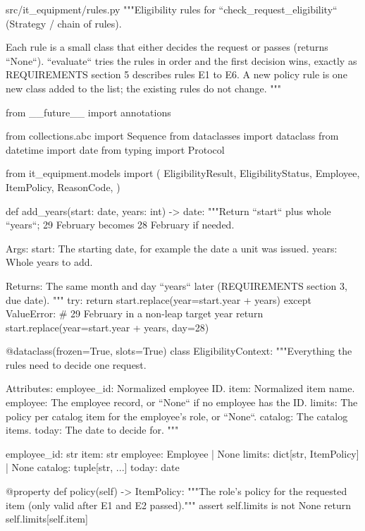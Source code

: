 \documentclass[11pt,letterpaper]{article}
\renewcommand{\_}{\textunderscore\allowbreak}
\begin{document}
\begin{codebox}{src/it_equipment/rules.py}
"""Eligibility rules for ``check_request_eligibility`` (Strategy / chain of rules).

Each rule is a small class that either decides the request or passes (returns ``None``).
``evaluate`` tries the rules in order and the first decision wins, exactly as REQUIREMENTS
section 5 describes rules E1 to E6. A new policy rule is one new class added to the list;
the existing rules do not change.
"""

from __future__ import annotations

from collections.abc import Sequence
from dataclasses import dataclass
from datetime import date
from typing import Protocol

from it_equipment.models import (
    EligibilityResult,
    EligibilityStatus,
    Employee,
    ItemPolicy,
    ReasonCode,
)


def add_years(start: date, years: int) -> date:
    """Return ``start`` plus whole ``years``; 29 February becomes 28 February if needed.

    Args:
        start: The starting date, for example the date a unit was issued.
        years: Whole years to add.

    Returns:
        The same month and day ``years`` later (REQUIREMENTS section 3, due date).
    """
    try:
        return start.replace(year=start.year + years)
    except ValueError:  # 29 February in a non-leap target year
        return start.replace(year=start.year + years, day=28)


@dataclass(frozen=True, slots=True)
class EligibilityContext:
    """Everything the rules need to decide one request.

    Attributes:
        employee_id: Normalized employee ID.
        item: Normalized item name.
        employee: The employee record, or ``None`` if no employee has the ID.
        limits: The policy per catalog item for the employee's role, or ``None``.
        catalog: The catalog items.
        today: The date to decide for.
    """

    employee_id: str
    item: str
    employee: Employee | None
    limits: dict[str, ItemPolicy] | None
    catalog: tuple[str, ...]
    today: date

    @property
    def policy(self) -> ItemPolicy:
        """The role's policy for the requested item (only valid after E1 and E2 passed)."""
        assert self.limits is not None
        return self.limits[self.item]


\end{codebox}
\end{document}
